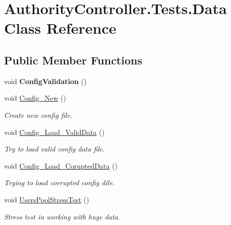 \hypertarget{class_authority_controller_1_1_tests_1_1_data}{}\section{Authority\+Controller.\+Tests.\+Data Class Reference}
\label{class_authority_controller_1_1_tests_1_1_data}
\subsection*{Public Member Functions}
\begin{DoxyCompactItemize}
\item 
\mbox{\label{class_authority_controller_1_1_tests_1_1_data_ac551d17113acad2ad5c7f800c4b7b95a}} 
void {\bfseries Config\+Validation} ()
\item 
void \mbox{\hyperlink{class_authority_controller_1_1_tests_1_1_data_acb31a8516eb780890bd38685d5435208}{Config\+\_\+\+New}} ()
\begin{DoxyCompactList}\small\item\em Create new config file. \end{DoxyCompactList}\item 
void \mbox{\hyperlink{class_authority_controller_1_1_tests_1_1_data_af561b8596539d402bc098808f879e17e}{Config\+\_\+\+Load\+\_\+\+Valid\+Data}} ()
\begin{DoxyCompactList}\small\item\em Try to load valid config data file. \end{DoxyCompactList}\item 
void \mbox{\hyperlink{class_authority_controller_1_1_tests_1_1_data_ab2498d27006a8609210f5d814ca4126f}{Config\+\_\+\+Load\+\_\+\+Corupted\+Data}} ()
\begin{DoxyCompactList}\small\item\em Trying to load corrupted config dile. \end{DoxyCompactList}\item 
void \mbox{\hyperlink{class_authority_controller_1_1_tests_1_1_data_a388eaa4ae3a3a646054856f459eb225c}{Users\+Pool\+Stress\+Test}} ()
\begin{DoxyCompactList}\small\item\em Stress test in working with huge data. \end{DoxyCompactList}\item 

\end{DoxyCompactItemize}
